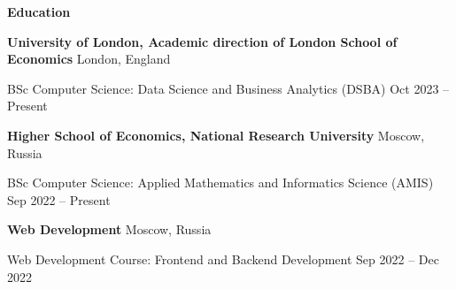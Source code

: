 \begin{center}
    \textbf{Education}
\end{center}
\textbf{University of London, Academic direction of London School of Economics} \hfill London, England

BSc Computer Science: Data Science and Business Analytics (DSBA) \hfill Oct 2023 – Present

\textbf{Higher School of Economics, National Research University} \hfill Moscow, Russia

BSc Computer Science: Applied Mathematics and Informatics Science (AMIS) \hfill Sep 2022 – Present

\textbf{Web Development} \hfill Moscow, Russia

Web Development Course: Frontend and Backend Development \hfill Sep 2022 – Dec 2022